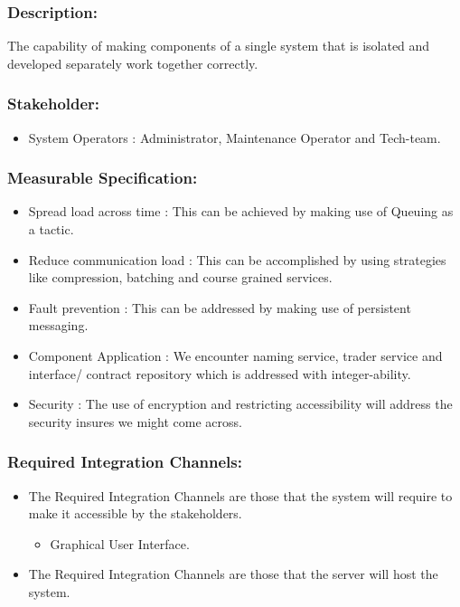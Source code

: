 \documentclass[11pt]{article}
\begin{document}
		\subsubsection{Description:}
			\textbf{}The capability of making components of a single system that is isolated and developed separately work together correctly.
		
		\subsubsection{Stakeholder:}
			\begin{itemize}
				\item System Operators : Administrator, Maintenance Operator and Tech-team.
			\end{itemize}
				
		\subsubsection{Measurable Specification:}
			
			\begin{itemize}			
			
				\item Spread load across time : This can be achieved by making use of Queuing as a tactic.
				\item Reduce communication load : This can be accomplished by using strategies like compression, batching and course grained services.
				\item  Fault prevention : This can be addressed by making use of persistent messaging.
				\item Component Application  : We encounter naming service, trader service and interface/ contract repository which is addressed with integer-ability.
				\item  Security : The use of encryption and restricting accessibility will address the security insures we might come across.
			
			\end{itemize}
			
			\subsubsection{Required Integration Channels:}
			\begin{itemize}			
			
				\item The Required Integration Channels are those that the system will require to make it accessible by the stakeholders.
				\begin{itemize}			
			
					\item Graphical User Interface.
				
				\end{itemize}	
			
				\item The Required Integration Channels are those that the server will host the system.
			\end{itemize}	
\end{document}

